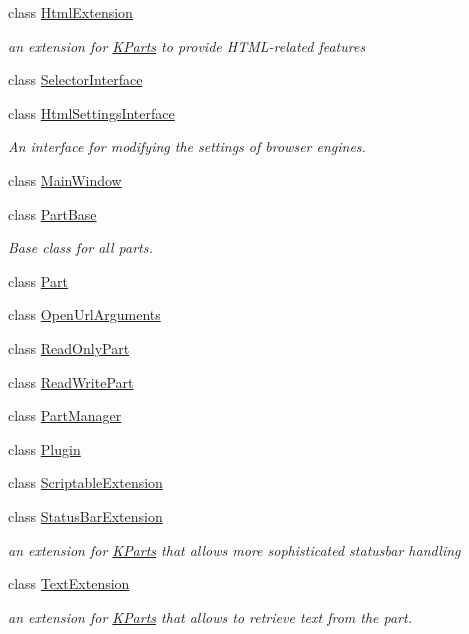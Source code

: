 \begin{DoxyCompactItemize}
\item 
class \hyperlink{classKParts_1_1HtmlExtension}{\-Html\-Extension}
\begin{DoxyCompactList}\small\item\em an extension for \hyperlink{namespaceKParts}{\-K\-Parts} to provide \-H\-T\-M\-L-\/related features \end{DoxyCompactList}\item 
class \hyperlink{classKParts_1_1SelectorInterface}{\-Selector\-Interface}
\item 
class \hyperlink{classKParts_1_1HtmlSettingsInterface}{\-Html\-Settings\-Interface}
\begin{DoxyCompactList}\small\item\em \-An interface for modifying the settings of browser engines. \end{DoxyCompactList}\item 
class \hyperlink{classKParts_1_1MainWindow}{\-Main\-Window}
\item 
class \hyperlink{classKParts_1_1PartBase}{\-Part\-Base}
\begin{DoxyCompactList}\small\item\em \-Base class for all parts. \end{DoxyCompactList}\item 
class \hyperlink{classKParts_1_1Part}{\-Part}
\item 
class \hyperlink{classKParts_1_1OpenUrlArguments}{\-Open\-Url\-Arguments}
\item 
class \hyperlink{classKParts_1_1ReadOnlyPart}{\-Read\-Only\-Part}
\item 
class \hyperlink{classKParts_1_1ReadWritePart}{\-Read\-Write\-Part}
\item 
class \hyperlink{classKParts_1_1PartManager}{\-Part\-Manager}
\item 
class \hyperlink{classKParts_1_1Plugin}{\-Plugin}
\item 
class \hyperlink{classKParts_1_1ScriptableExtension}{\-Scriptable\-Extension}
\item 
class \hyperlink{classKParts_1_1StatusBarExtension}{\-Status\-Bar\-Extension}
\begin{DoxyCompactList}\small\item\em an extension for \hyperlink{namespaceKParts}{\-K\-Parts} that allows more sophisticated statusbar handling \end{DoxyCompactList}\item 
class \hyperlink{classKParts_1_1TextExtension}{\-Text\-Extension}
\begin{DoxyCompactList}\small\item\em an extension for \hyperlink{namespaceKParts}{\-K\-Parts} that allows to retrieve text from the part. \end{DoxyCompactList}\end{DoxyCompactItemize}

